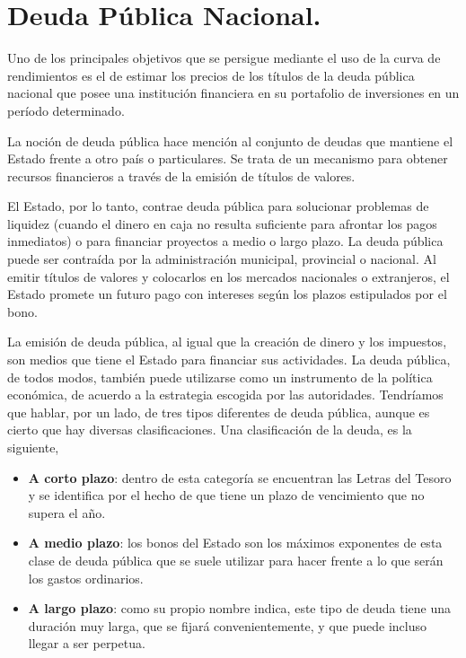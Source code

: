 \section{Deuda P\'ublica Nacional.}

\hspace*{0.4 cm} Uno de los principales objetivos que se persigue mediante el uso de la curva de rendimientos es el de estimar los precios de los t\'itulos de la deuda p\'ublica nacional que posee una instituci\'on financiera en su portafolio de inversiones en un per\'iodo determinado. 



\hspace*{0.4 cm} La noci\'on de deuda p\'ublica hace menci\'on al conjunto de deudas que mantiene el Estado frente a otro pa\'is o particulares. Se trata de un mecanismo para obtener recursos financieros a trav\'es de la emisi\'on de t\'itulos de valores.

\hspace*{0.4 cm} El Estado, por lo tanto, contrae deuda p\'ublica para solucionar problemas de liquidez (cuando el dinero en caja no resulta suficiente para afrontar los pagos inmediatos) o para financiar proyectos a medio o largo plazo. La deuda p\'ublica puede ser contra\'ida por la administraci\'on municipal, provincial o nacional. Al emitir t\'itulos de valores y colocarlos en los mercados nacionales o extranjeros, el Estado promete un futuro pago con intereses seg\'un los plazos estipulados por el bono.

\hspace*{0.4 cm} La emisi\'on de deuda p\'ublica, al igual que la creaci\'on de dinero y los impuestos, son medios que tiene el Estado para financiar sus actividades. La deuda p\'ublica, de todos modos, tambi\'en puede utilizarse como un instrumento de la pol\'itica econ\'omica, de acuerdo a la estrategia escogida por las autoridades. Tendr\'iamos que hablar, por un lado, de tres tipos diferentes de deuda p\'ublica, aunque es cierto que hay diversas clasificaciones. Una clasificaci\'on de la deuda, es la siguiente,

\begin{itemize}
  \item \textbf{A corto plazo}: dentro de esta categor\'ia se encuentran las Letras del Tesoro y se identifica por el hecho de que tiene un plazo de vencimiento que no supera el a\~no.
  \item \textbf{A medio plazo}: los bonos del Estado son los m\'aximos exponentes de esta clase de deuda p\'ublica que se suele utilizar para hacer frente a lo que ser\'an los gastos ordinarios.
  \item \textbf{A largo plazo}: como su propio nombre indica, este tipo de deuda tiene una duraci\'on muy larga, que se fijar\'a convenientemente, y que puede incluso llegar a ser perpetua. 
\end{itemize}


